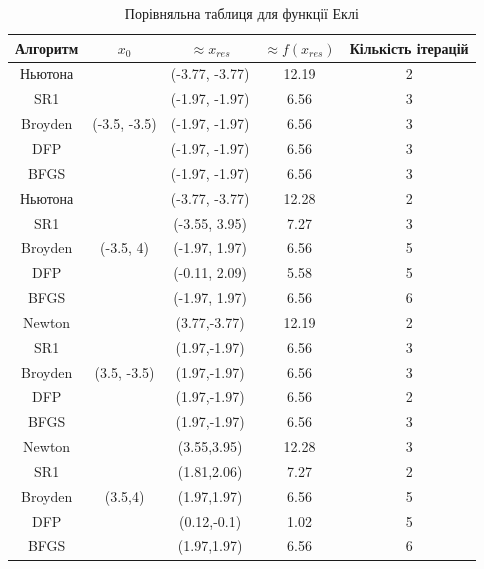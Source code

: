 \begin{table}[h!]
    \centering
    \begin{tabular}{|c|c|c|c|c|}
        \hline
        \textbf{Алгоритм} & $x_{0}$ & $\approx x_{res}$ & $\approx f(x_{res})$ & \textbf{Кількість ітерацій}  \\
        \hline
        Ньютона & \multirow{5}{*}{(-3.5, -3.5)} & (-3.77, -3.77) & 12.19 & 2 \\
        \cline{1-1} \cline{3-5}
        SR1 & & (-1.97, -1.97) & 6.56 & 3 \\
        \cline{1-1} \cline{3-5}
        Broyden & & (-1.97, -1.97) & 6.56 & 3 \\
        \cline{1-1} \cline{3-5}
        DFP & & (-1.97, -1.97) & 6.56 & 3 \\
        \cline{1-1} \cline{3-5}
        BFGS & & (-1.97, -1.97) & 6.56 & 3 \\
        \hline
        Ньютона & \multirow{5}{*}{(-3.5, 4)} & (-3.77, -3.77) & 12.28 & 2 \\
        \cline{1-1} \cline{3-5}
        SR1 & & (-3.55, 3.95) & 7.27 & 3 \\
        \cline{1-1} \cline{3-5}
        Broyden & & (-1.97, 1.97) & 6.56 & 5 \\
        \cline{1-1} \cline{3-5}
        DFP & & (-0.11, 2.09) & 5.58 & 5 \\
        \cline{1-1} \cline{3-5}
        BFGS & & (-1.97, 1.97) & 6.56 & 6 \\
        \hline
        Newton & \multirow{5}{*}{(3.5, -3.5)} & (3.77,-3.77) & 12.19 & 2 \\
        \cline{1-1} \cline{3-5}
        SR1 & & (1.97,-1.97) & 6.56 & 3 \\
        \cline{1-1} \cline{3-5}
        Broyden & & (1.97,-1.97) & 6.56 & 3 \\
        \cline{1-1} \cline{3-5}
        DFP & & (1.97,-1.97) & 6.56 & 2 \\
        \cline{1-1} \cline{3-5}
        BFGS & & (1.97,-1.97) & 6.56 & 3 \\
        \hline
        Newton & \multirow{5}{*}{(3.5,4)} & (3.55,3.95) & 12.28 & 3 \\
        \cline{1-1} \cline{3-5}
        SR1 & & (1.81,2.06) & 7.27 & 2 \\
        \cline{1-1} \cline{3-5}
        Broyden & & (1.97,1.97) & 6.56 & 5 \\
        \cline{1-1} \cline{3-5}
        DFP & & (0.12,-0.1) & 1.02 & 5 \\
        \cline{1-1} \cline{3-5}
        BFGS & & (1.97,1.97) & 6.56 & 6 \\
        \hline
    \end{tabular}
    \caption{Порівняльна таблиця для функції Еклі}
\end{table}
